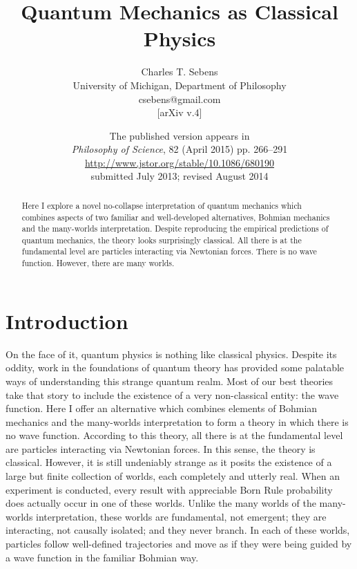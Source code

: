 \documentclass[onecolumn,secnumarabic,balancelastpage,amsmath,amssymb,nofootinbib]{article}
\begin{document}



\title{Quantum Mechanics as Classical Physics}
\author{Charles T. Sebens\\University of Michigan, Department of Philosophy\\csebens@gmail.com\\ \small{[arXiv v.4]}}
\date{The published version appears in\\\textit{Philosophy of Science}, 82 (April 2015) pp. 266--291\\\small{\url{http://www.jstor.org/stable/10.1086/680190}}\\\small{submitted July 2013; revised August 2014}}

\maketitle

\begin{abstract}
Here I explore a novel no-collapse interpretation of quantum mechanics which combines aspects of two familiar and well-developed alternatives, Bohmian mechanics and the many-worlds interpretation.  Despite reproducing the empirical predictions of quantum mechanics, the theory looks surprisingly classical.  All there is at the fundamental level are particles interacting via Newtonian forces.  There is no wave function.  However, there are many worlds.
\end{abstract}


\section{Introduction}
On the face of it, quantum physics is nothing like classical physics.  Despite its oddity, work in the foundations of quantum theory has provided some palatable ways of understanding this strange quantum realm.  Most of our best theories take that story to include the existence of a very non-classical entity: the wave function.  Here I offer an alternative which combines elements of Bohmian mechanics and the many-worlds interpretation to form a theory in which there is no wave function.  According to this theory, all there is at the fundamental level are particles interacting via Newtonian forces.  In this sense, the theory is classical.  However, it is still undeniably strange as it posits the existence of a large but finite collection of worlds, each completely and utterly real.  When an experiment is conducted, every result with appreciable Born Rule probability does actually occur in one of these worlds.  Unlike the many worlds of the many-worlds interpretation, these worlds are fundamental, not emergent; they are interacting, not causally isolated; and they never branch.  In each of these worlds, particles follow well-defined trajectories and move as if they were being guided by a wave function in the familiar Bohmian way.
\end{document}
